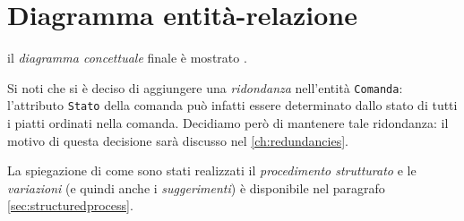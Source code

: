 \section{Diagramma entità-relazione}
il {\it diagramma concettuale} finale è mostrato .

Si noti che si è deciso di aggiungere una {\it ridondanza} nell'entità {\tt Comanda}:
l'attributo {\tt Stato} della comanda può infatti essere determinato dallo stato di
tutti i piatti ordinati nella comanda. Decidiamo però di mantenere tale ridondanza:
il motivo di questa decisione sarà discusso nel \vref{ch:redundancies}.

La spiegazione di come sono stati realizzati il {\it procedimento strutturato} e le {\it variazioni}
(e quindi anche i {\it suggerimenti}) è disponibile nel paragrafo \vref{sec:structuredprocess}.
\clearpage
\begin{landscape}
\thispagestyle{empty}
\label{fig:conceptdiagram}
\end{landscape}
